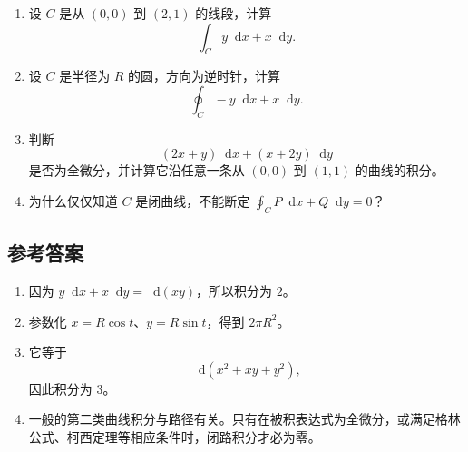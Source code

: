 \documentclass[UTF8,11pt]{ctexart}
\newcommand{\dif}{\mathop{}\!\mathrm{d}}
\begin{document}
\begin{enumerate}
  \item 设 $C$ 是从 $(0,0)$ 到 $(2,1)$ 的线段，计算
        \[
        \int_C y\dif x+x\dif y.
        \]
  \item 设 $C$ 是半径为 $R$ 的圆，方向为逆时针，计算
        \[
        \oint_C -y\dif x+x\dif y.
        \]
  \item 判断
        \[
        (2x+y)\dif x+(x+2y)\dif y
        \]
        是否为全微分，并计算它沿任意一条从 $(0,0)$ 到 $(1,1)$ 的曲线的积分。
  \item 为什么仅仅知道 $C$ 是闭曲线，不能断定
        \(
        \oint_C P\dif x+Q\dif y=0
        \)？
\end{enumerate}

\subsection*{参考答案}

\begin{enumerate}
  \item 因为 $y\dif x+x\dif y=\dif(xy)$，所以积分为 $2$。
  \item 参数化 $x=R\cos t$、$y=R\sin t$，得到 $2\pi R^2$。
  \item 它等于
        \[
        \dif(x^2+xy+y^2),
        \]
        因此积分为 $3$。
  \item 一般的第二类曲线积分与路径有关。只有在被积表达式为全微分，或满足格林公式、柯西定理等相应条件时，闭路积分才必为零。
\end{enumerate}
\end{document}
